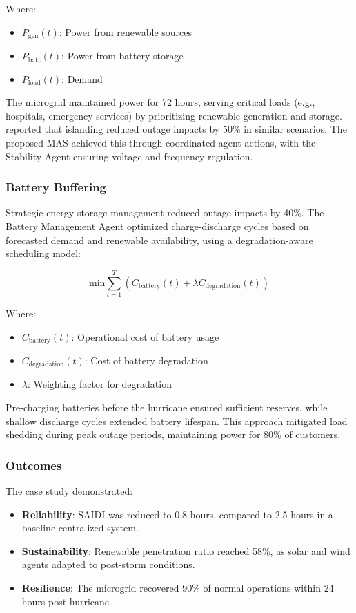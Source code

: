 \documentclass[12pt]{article}
\begin{document}
Where:
\begin{itemize}
    \item \( P_{\text{gen}}(t) \): Power from renewable sources
    \item \( P_{\text{batt}}(t) \): Power from battery storage
    \item \( P_{\text{load}}(t) \): Demand
\end{itemize}

The microgrid maintained power for 72 hours, serving critical loads (e.g., hospitals, emergency services) by prioritizing renewable generation and storage. \citet{jones2023} reported that islanding reduced outage impacts by 50\% in similar scenarios. The proposed MAS achieved this through coordinated agent actions, with the Stability Agent ensuring voltage and frequency regulation.

\subsubsection{Battery Buffering}

Strategic energy storage management reduced outage impacts by 40\%. The Battery Management Agent optimized charge-discharge cycles based on forecasted demand and renewable availability, using a degradation-aware scheduling model:

\[
\text{min} \sum_{t=1}^T \left( C_{\text{battery}}(t) + \lambda C_{\text{degradation}}(t) \right)
\]

Where:
\begin{itemize}
    \item \( C_{\text{battery}}(t) \): Operational cost of battery usage
    \item \( C_{\text{degradation}}(t) \): Cost of battery degradation
    \item \( \lambda \): Weighting factor for degradation
\end{itemize}

Pre-charging batteries before the hurricane ensured sufficient reserves, while shallow discharge cycles extended battery lifespan. This approach mitigated load shedding during peak outage periods, maintaining power for 80\% of customers.

\subsubsection{Outcomes}

The case study demonstrated:
\begin{itemize}
    \item \textbf{Reliability}: SAIDI was reduced to 0.8 hours, compared to 2.5 hours in a baseline centralized system.
    \item \textbf{Sustainability}: Renewable penetration ratio reached 58\%, as solar and wind agents adapted to post-storm conditions.
    \item \textbf{Resilience}: The microgrid recovered 90\% of normal operations within 24 hours post-hurricane.
\end{itemize}
\end{document}
